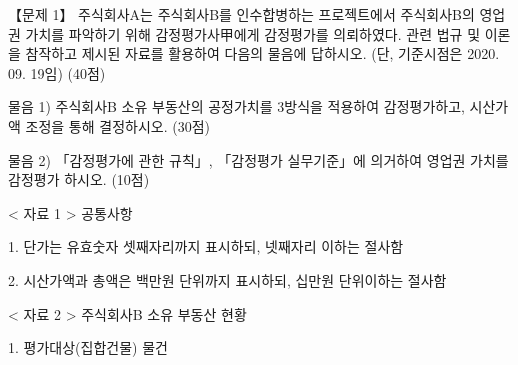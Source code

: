 \begin{longquestion}{【문제 1】}
주식회사A는 주식회사B를 인수합병하는 프로젝트에서 주식회사B의 영업권 가치를 파악하기 위해 감정평가사甲에게 감정평가를 의뢰하였다. 관련 법규 및 이론을 참작하고 제시된 자료를 활용하여 다음의 물음에 답하시오. (단, 기준시점은 2020. 09. 19임) (40점) \par
\medskip\noindent 물음 1) 주식회사B 소유 부동산의 공정가치를 3방식을 적용하여 감정평가하고, 시산가액 조정을 통해 결정하시오. (30점) \par
\medskip\noindent 물음 2) 「감정평가에 관한 규칙」, 「감정평가 실무기준」에 의거하여 영업권 가치를 감정평가 하시오. (10점) \par
< 자료 1 > 공통사항 \par
1. 단가는 유효숫자 셋째자리까지 표시하되, 넷째자리 이하는 절사함 \par
2. 시산가액과 총액은 백만원 단위까지 표시하되, 십만원 단위이하는 절사함 \par
< 자료 2 > 주식회사B 소유 부동산 현황 \par
1. 평가대상(집합건물) 물건 \par
{\small\centering\renewcommand{\arraystretch}{1.25}
\par}


\end{longquestion}
